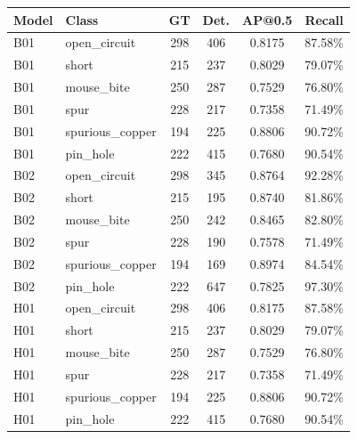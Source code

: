 \begin{tabular}{llcccc}
\hline
Model & Class & GT & Det. & AP@0.5 & Recall \\
\hline
B01 & open\_circuit & 298 & 406 & 0.8175 & 87.58\% \\
B01 & short & 215 & 237 & 0.8029 & 79.07\% \\
B01 & mouse\_bite & 250 & 287 & 0.7529 & 76.80\% \\
B01 & spur & 228 & 217 & 0.7358 & 71.49\% \\
B01 & spurious\_copper & 194 & 225 & 0.8806 & 90.72\% \\
B01 & pin\_hole & 222 & 415 & 0.7680 & 90.54\% \\
B02 & open\_circuit & 298 & 345 & 0.8764 & 92.28\% \\
B02 & short & 215 & 195 & 0.8740 & 81.86\% \\
B02 & mouse\_bite & 250 & 242 & 0.8465 & 82.80\% \\
B02 & spur & 228 & 190 & 0.7578 & 71.49\% \\
B02 & spurious\_copper & 194 & 169 & 0.8974 & 84.54\% \\
B02 & pin\_hole & 222 & 647 & 0.7825 & 97.30\% \\
H01 & open\_circuit & 298 & 406 & 0.8175 & 87.58\% \\
H01 & short & 215 & 237 & 0.8029 & 79.07\% \\
H01 & mouse\_bite & 250 & 287 & 0.7529 & 76.80\% \\
H01 & spur & 228 & 217 & 0.7358 & 71.49\% \\
H01 & spurious\_copper & 194 & 225 & 0.8806 & 90.72\% \\
H01 & pin\_hole & 222 & 415 & 0.7680 & 90.54\% \\
\hline
\end{tabular}
